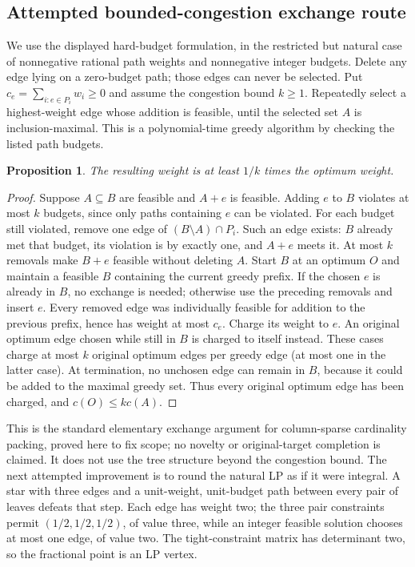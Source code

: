 \documentclass[11pt]{article}
\newtheorem{proposition}{Proposition}
\begin{document}
\subsection{Attempted bounded-congestion exchange route}
We use the displayed hard-budget formulation, in the restricted but natural case of nonnegative rational path weights and nonnegative integer budgets. Delete any edge lying on a zero-budget path; those edges can never be selected. Put $c_e=\sum_{i:e\in P_i}w_i\ge0$ and assume the congestion bound $k\ge1$. Repeatedly select a highest-weight edge whose addition is feasible, until the selected set $A$ is inclusion-maximal. This is a polynomial-time greedy algorithm by checking the listed path budgets.
\begin{proposition}
The resulting weight is at least $1/k$ times the optimum weight.
\end{proposition}
\begin{proof}
Suppose $A\subseteq B$ are feasible and $A+e$ is feasible. Adding $e$ to $B$ violates at most $k$ budgets, since only paths containing $e$ can be violated. For each budget still violated, remove one edge of $(B\setminus A)\cap P_i$. Such an edge exists: $B$ already met that budget, its violation is by exactly one, and $A+e$ meets it. At most $k$ removals make $B+e$ feasible without deleting $A$.
Start $B$ at an optimum $O$ and maintain a feasible $B$ containing the current greedy prefix. If the chosen $e$ is already in $B$, no exchange is needed; otherwise use the preceding removals and insert $e$. Every removed edge was individually feasible for addition to the previous prefix, hence has weight at most $c_e$. Charge its weight to $e$. An original optimum edge chosen while still in $B$ is charged to itself instead. These cases charge at most $k$ original optimum edges per greedy edge (at most one in the latter case). At termination, no unchosen edge can remain in $B$, because it could be added to the maximal greedy set. Thus every original optimum edge has been charged, and $c(O)\le k c(A)$.
\end{proof}
This is the standard elementary exchange argument for column-sparse cardinality packing, proved here to fix scope; no novelty or original-target completion is claimed. It does not use the tree structure beyond the congestion bound.
The next attempted improvement is to round the natural LP as if it were integral. A star with three edges and a unit-weight, unit-budget path between every pair of leaves defeats that step. Each edge has weight two; the three pair constraints permit $(1/2,1/2,1/2)$, of value three, while an integer feasible solution chooses at most one edge, of value two. The tight-constraint matrix has determinant two, so the fractional point is an LP vertex.
\end{document}
